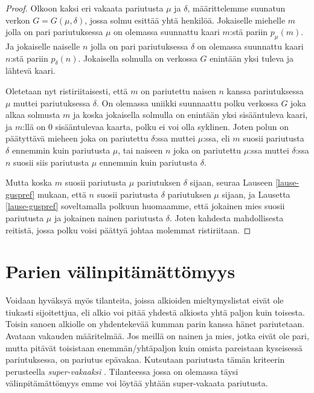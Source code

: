 \documentclass[finnish]{tktltiki2}
\theoremstyle{definition}
\theoremstyle{remark}
\begin{document}
\begin{proof}\cite[p. 27]{gusfield1989stable}
Olkoon kaksi eri vakaata pariutusta $\mu$ ja $\delta$, määrittelemme suunatun verkon $G = G(\mu, \delta)$, jossa solmu esittää yhtä henkilöä. Jokaiselle miehelle $m$ jolla on pari pariutuksessa $\mu$ on olemassa suunnattu kaari $m$:stä pariin $p_{\mu}(m)$. Ja jokaiselle naiselle $n$ jolla on pari pariutuksessa $\delta$ on olemassa suunnattu kaari $n$:stä pariin $p_{\delta}(n)$.
Jokaisella solmulla on verkossa $G$ enintään yksi tuleva ja lähtevä kaari.

Oletetaan nyt ristiriitaisesti, että $m$ on pariutettu naisen $n$ kanssa pariutuksessa $\mu$ muttei pariutuksessa $\delta$. On olemassa uniikki suunnaattu polku verkossa $G$ joka alkaa solmusta $m$ ja koska jokaisella solmulla on enintään yksi sisääntuleva kaari, ja $m$:llä on 0 sisääntulevaa kaarta, polku ei voi olla syklinen. Joten polun on päätyttävä mieheen joka on pariutettu $\delta$:ssa muttei $\mu$:ssa, eli $m$ suosii pariutusta $\delta$ ennemmin kuin pariutusta $\mu$, tai naiseen $n$ joka on pariutettu $\mu$:ssa muttei $\delta$:ssa $n$ suosii siis pariutusta $\mu$ ennemmin kuin pariutusta $\delta$.

Mutta koska $m$ suosii pariutusta $\mu$ pariutuksen $\delta$ sijaan, seuraa Lauseen \ref{lause-guspref} mukaan, että $n$ suosii pariutusta $\delta$ pariutuksen $\mu$ sijaan, ja Lausetta \ref{lause-guspref} soveltamalla polkuun huomaamme, että jokainen mies suosii pariutusta $\mu$ ja jokainen nainen pariutusta $\delta$. Joten kahdesta mahdollisesta reitistä, jossa polku voisi päättyä johtaa molemmat ristiriitaan.
\end{proof}

\section{Parien välinpitämättömyys}
Voidaan hyväksyä myös tilanteita, joissa alkioiden mieltymyslistat eivät ole tiukasti sijoitettjua, eli alkio voi pitää yhdestä alkiosta yhtä paljon kuin toisesta. Toisin sanoen alkiolle on yhdentekevää kumman parin kanssa hänet pariutetaan. Avataan vakauden määritelmää. Jos meillä on nainen ja mies, jotka eivät ole pari, mutta pitävät toisistaan enemmän/yhtäpaljon kuin omista pareistaan kyseisessä pariutuksessa, on pariutus epävakaa. Kutsutaan pariutusta tämän kriteerin perusteella \emph{super-vakaaksi} \cite{gusfield1989stable}. Tilanteessa jossa on olemassa täysi välinpitämättömyys emme voi löytää yhtään super-vakaata pariutusta.
\end{document}
